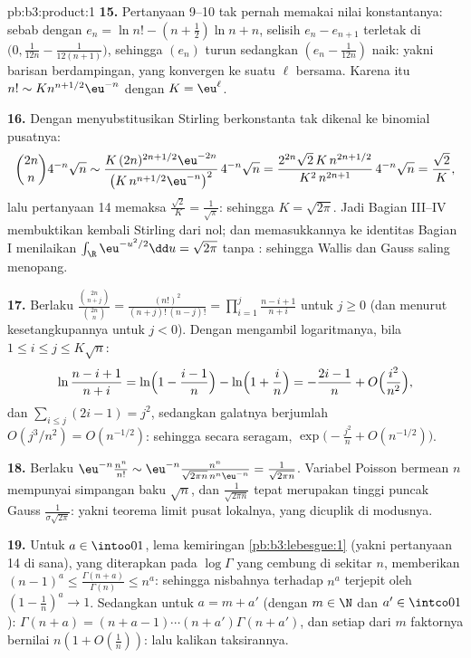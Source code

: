 \begin{solution}{pb:b3:product:1}
\textbf{15.} Pertanyaan 9--10 tak pernah memakai nilai
konstantanya: sebab dengan $e_n = \ln n! - (n+\frac12)\ln n + n$,
selisih $e_n - e_{n+1}$ terletak di $\bigl(0, \frac1{12n} -
\frac1{12(n+1)}\bigr)$, sehingga $(e_n)$ turun sedangkan $(e_n -
\frac1{12n})$ naik: yakni barisan berdampingan, yang konvergen ke
suatu $\ell$ bersama. Karena itu $n! \sim K n^{n+1/2}\eu^{-n}$ dengan $K =
\eu^\ell$.

\textbf{16.} Dengan menyubstitusikan Stirling berkonstanta tak dikenal ke
binomial pusatnya:
\[
\binom{2n}n4^{-n}\sqrt n \sim
\frac{K\,(2n)^{2n+1/2}\eu^{-2n}}{\bigl(K\,n^{n+1/2}
\eu^{-n}\bigr)^2}\,4^{-n}\sqrt n
= \frac{2^{2n}\sqrt{2}\,K\,n^{2n+1/2}}{K^2\,n^{2n+1}}
\,4^{-n}\sqrt n = \frac{\sqrt2}{K},
\]
lalu pertanyaan 14 memaksa $\frac{\sqrt2}K = \frac1{\sqrt\pi}$:
sehingga $K = \sqrt{2\pi}$. Jadi Bagian III--IV membuktikan kembali Stirling dari
nol; dan memasukkannya ke identitas Bagian I menilaikan
$\int_\R\eu^{-u^2/2}\dd u = \sqrt{2\pi}$ tanpa : sehingga Wallis dan Gauss saling menopang.

\textbf{17.} Berlaku $\frac{\binom{2n}{n+j}}{\binom{2n}n} =
\frac{(n!)^2}{(n+j)!\,(n-j)!} =
\prod_{i=1}^{j}\frac{n-i+1}{n+i}$ untuk $j \geq 0$ (dan menurut
kesetangkupannya untuk $j < 0$). Dengan mengambil logaritmanya, bila $1 \leq i
\leq j \leq K\sqrt n$:
\[
\ln\frac{n-i+1}{n+i} = \ln\Bigl(1 - \frac{i-1}n\Bigr) -
\ln\Bigl(1 + \frac in\Bigr) = -\frac{2i-1}{n} +
O\Bigl(\frac{i^2}{n^2}\Bigr),
\]
dan $\sum_{i\leq j}(2i - 1) = j^2$, sedangkan galatnya berjumlah
$O(j^3/n^2) = O(n^{-1/2})$: sehingga secara seragam,
$\exp\bigl(-\frac{j^2}n + O(n^{-1/2})\bigr)$.

\textbf{18.} Berlaku $\eu^{-n}\frac{n^n}{n!} \sim \eu^{-n}
\frac{n^n}{\sqrt{2\pi n}\,n^n\eu^{-n}} =
\frac1{\sqrt{2\pi n}}$. Variabel Poisson bermean $n$ mempunyai
simpangan baku $\sqrt n$, dan $\frac1{\sqrt{2\pi n}}$ tepat
merupakan tinggi puncak Gauss $\frac1{\sigma\sqrt{2\pi}}$:
yakni teorema limit pusat lokalnya, yang dicuplik di modusnya.

\textbf{19.} Untuk $a \in \intoo01$, lema kemiringan
\cref{pb:b3:lebesgue:1} (yakni pertanyaan 14 di sana), yang diterapkan pada
$\log\Gamma$ yang cembung di sekitar $n$, memberikan $(n-1)^a \leq
\frac{\Gamma(n+a)}{\Gamma(n)} \leq n^a$: sehingga nisbahnya terhadap $n^a$
terjepit oleh $(1 - \frac1n)^a \to 1$. Sedangkan untuk $a = m + a'$
(dengan $m \in \N$ dan $a' \in \intco01$): $\Gamma(n+a) = (n + a - 1)
\cdots(n + a')\Gamma(n + a')$, dan setiap dari $m$ faktornya bernilai
$n(1 + O(\frac1n))$: lalu kalikan taksirannya.


\end{solution}

